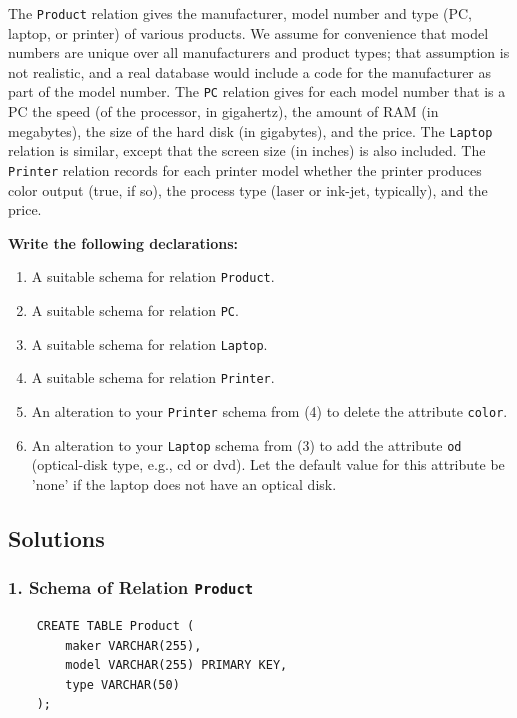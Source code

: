 \documentclass{cshwk}
\begin{document}
The \texttt{Product} relation gives the manufacturer, model number and type (PC, laptop, or printer) of various products. We assume for convenience that model numbers are unique over all manufacturers and product types; that assumption is not realistic, and a real database would include a code for the manufacturer as part of the model number. The \texttt{PC} relation gives for each model number that is a PC the speed (of the processor, in gigahertz), the amount of RAM (in megabytes), the size of the hard disk (in gigabytes), and the price. The \texttt{Laptop} relation is similar, except that the screen size (in inches) is also included. The \texttt{Printer} relation records for each printer model whether the printer produces color output (true, if so), the process type (laser or ink-jet, typically), and the price.

\textbf{Write the following declarations:}
\begin{enumerate}
    \item A suitable schema for relation \texttt{Product}.
    \item A suitable schema for relation \texttt{PC}.
    \item A suitable schema for relation \texttt{Laptop}.
    \item A suitable schema for relation \texttt{Printer}.
    \item An alteration to your \texttt{Printer} schema from (4) to delete the attribute \texttt{color}.
    \item An alteration to your \texttt{Laptop} schema from (3) to add the attribute \texttt{od} (optical-disk type, e.g., cd or dvd). Let the default value for this attribute be 'none' if the laptop does not have an optical disk.
\end{enumerate}

\subsection*{Solutions}

\subsubsection*{1. Schema of Relation \texttt{Product}}

\begin{verbatim}
    CREATE TABLE Product (
        maker VARCHAR(255),
        model VARCHAR(255) PRIMARY KEY,
        type VARCHAR(50)
    );    
\end{verbatim}
\end{document}
